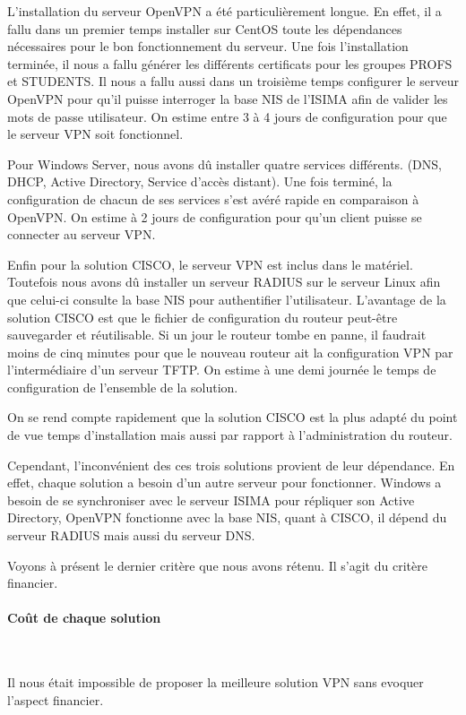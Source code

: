 L'installation du serveur OpenVPN a été particulièrement longue. En effet, il a fallu dans un premier temps installer sur CentOS toute les dépendances nécessaires pour le bon fonctionnement du serveur. Une fois l'installation terminée, il nous a fallu générer les différents certificats pour les groupes PROFS et STUDENTS. Il nous a fallu aussi dans un troisième temps configurer le serveur OpenVPN pour qu'il puisse interroger la base NIS de l'ISIMA afin de valider les mots de passe utilisateur.
On estime entre 3 à 4 jours de configuration pour que le serveur VPN soit fonctionnel.

Pour Windows Server, nous avons dû installer quatre services différents. (DNS, DHCP, Active Directory, Service d'accès distant). Une fois terminé, la configuration de chacun de ses services s'est avéré rapide en comparaison à OpenVPN.
On estime à 2 jours de configuration pour qu'un client puisse se connecter au serveur VPN.

Enfin pour la solution CISCO, le serveur VPN est inclus dans le matériel. Toutefois nous avons dû installer un serveur RADIUS sur le serveur Linux afin que celui-ci consulte la base NIS pour authentifier l'utilisateur. L'avantage de la solution CISCO est que le fichier de configuration du routeur peut-être sauvegarder et réutilisable. Si un jour le routeur tombe en panne, il faudrait moins de cinq minutes pour que le nouveau routeur ait la configuration VPN par l'intermédiaire d'un serveur TFTP.
On estime à une demi journée le temps de configuration de l'ensemble de la solution.


On se rend compte rapidement que la solution CISCO est la plus adapté du point de vue temps d'installation mais aussi par rapport à l'administration du routeur.

Cependant, l'inconvénient des ces trois solutions provient de leur dépendance. En effet, chaque solution a besoin d'un autre serveur pour fonctionner. Windows a besoin de se synchroniser avec le serveur ISIMA pour répliquer son Active Directory, OpenVPN fonctionne avec la base NIS, quant à CISCO, il dépend du serveur RADIUS mais aussi du serveur DNS.

Voyons à présent le dernier critère que nous avons rétenu. Il s'agit du critère financier. 

\paragraph{Coût de chaque solution}
~\

Il nous était impossible de proposer la meilleure solution VPN sans evoquer l'aspect financier. 

